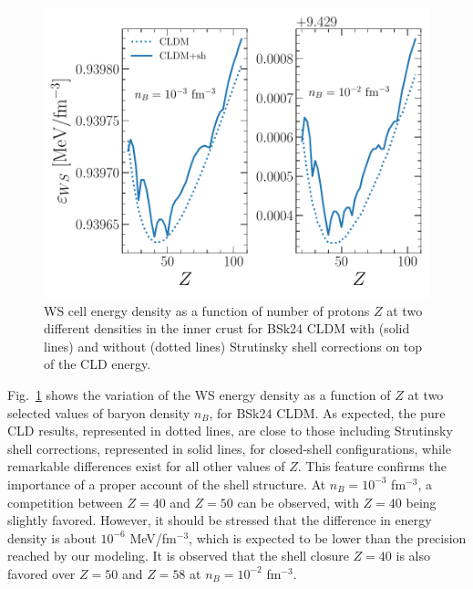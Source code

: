 \begin{figure}[!t]
\begin{center}
  \includegraphics[width=0.9\linewidth]{figures/shcorr_bsk24.pdf}
\end{center}
\caption[Perturbative implementation of proton shell corrections for BSk24]{WS 
  cell energy density as a function of number of protons $Z$ at two
different densities in the inner crust for BSk24 CLDM with (solid lines) and
without (dotted lines) Strutinsky shell corrections on top of the CLD 
energy. }\label{fig:shcorr_bsk24}
\end{figure}

Fig.~\ref{fig:shcorr_bsk24} shows the variation of the WS energy density as a
function of $Z$ at two selected values of baryon density $n_B$, for BSk24 CLDM. 
As expected, the pure CLD results, represented in dotted lines, are close to 
those including Strutinsky shell corrections, represented in solid lines, for 
closed-shell configurations, while remarkable differences exist for all other 
values of $Z$. This feature confirms the importance of a proper account of the 
shell structure. At $n_B = 10^{-3}$ fm$^{-3}$, a competition between $Z=40$ and
$Z=50$ can be observed, with $Z=40$ being slightly favored. However, it should
be stressed that the difference in energy density is about $10^{-6}$ 
MeV/fm$^{-3}$, which is expected to be lower than the precision reached by our
modeling. It is observed that the shell closure $Z=40$ is also favored over 
$Z=50$ and $Z=58$ at $n_B = 10^{-2}$ fm$^{-3}$.

